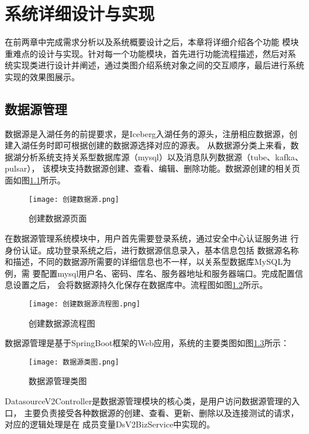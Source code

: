 
\chapter{系统详细设计与实现}

在前两章中完成需求分析以及系统概要设计之后，本章将详细介绍各个功能
模块重难点的设计与实现。针对每一个功能模块，首先进行功能流程描述，然后对系
统实现类进行设计并阐述，通过类图介绍系统对象之间的交互顺序，最后进行系统实现的效果图展示。

\section{数据源管理}

数据源是入湖任务的前提要求，是Iceberg入湖任务的源头，注册相应数据源，创建入湖任务时即可根据创建的数据源选择对应的源表。
从数据源分类上来看，数据湖分析系统支持关系型数据库源（mysql）以及消息队列数据源（tube、kafka、pulsar），
该模块支持数据源创建、查看、编辑、删除功能。数据源创建的相关页面如图\ref{fig:创建数据源页面}所示。

\begin{figure}[H]
  \centering
  \texttt{[image: 创建数据源.png]}
  \caption{创建数据源页面}
  \label{fig:创建数据源页面}
\end{figure}

在数据源管理系统模块中，用户首先需要登录系统，通过安全中心认证服务进
行身份认证。成功登录系统之后，进行数据源信息录入，基本信息包括
数据源名称和描述，不同的数据源所需要的详细信息也不一样，以关系型数据库MySQL为例，需
要配置mysql用户名、密码、库名、服务器地址和服务器端口。完成配置信息设置之后，
会将数据源持久化保存在数据库中。流程图如图\ref{fig:创建数据源流程图}所示。

\begin{figure}[H]
  \centering
  \texttt{[image: 创建数据源流程图.png]}
  \caption{创建数据源流程图}
  \label{fig:创建数据源流程图}
\end{figure}

数据源管理是基于SpringBoot框架的Web应用，系统的主要类图如图\ref{fig:数据源类图}所示：

\begin{figure}[H]
  \centering
  \texttt{[image: 数据源类图.png]}
  \caption{数据源管理类图}
  \label{fig:数据源类图}
\end{figure}

DatasourceV2Controller是数据源管理模块的核心类，是用户访问数据源管理的入口，
主要负责接受各种数据源的创建、查看、更新、删除以及连接测试的请求，对应的逻辑处理是在
成员变量DsV2BizService中实现的。


